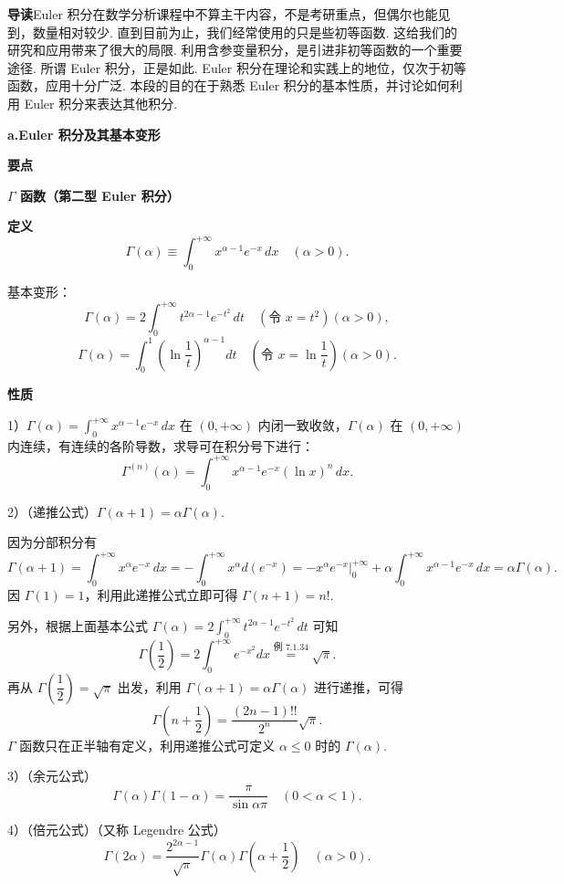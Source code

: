 \documentclass[UTF8,12pt,a4paper,fontset=fandol]{ctexart}
\begin{document}
\noindent\textbf{导读}\quad Euler 积分在数学分析课程中不算主干内容，不是考研重点，但偶尔也能见到，数量相对较少.
直到目前为止，我们经常使用的只是些初等函数. 这给我们的研究和应用带来了很大的局限. 利用含参变量积分，是引进非初等函数的一个重要途径. 所谓 Euler 积分，正是如此. Euler 积分在理论和实践上的地位，仅次于初等函数，应用十分广泛. 本段的目的在于熟悉 Euler 积分的基本性质，并讨论如何利用 Euler 积分来表达其他积分.

\noindent\textbf{a.\quad Euler 积分及其基本变形}

\noindent\textbf{要点}\quad

\noindent\textbf{$\Gamma$ 函数（第二型 Euler 积分）}

\noindent\textbf{定义}\quad
\[
\Gamma(\alpha)\equiv\int_0^{+\infty}x^{\alpha-1}e^{-x}\,dx\quad(\alpha>0).
\]

\noindent 基本变形：
\[
\Gamma(\alpha)=2\int_0^{+\infty}t^{2\alpha-1}e^{-t^2}\,dt
\quad(\text{令 }x=t^2)(\alpha>0),
\]
\[
\Gamma(\alpha)=\int_0^1\left(\ln\frac1t\right)^{\alpha-1}dt
\quad\left(\text{令 }x=\ln\frac1t\right)(\alpha>0).
\]

\noindent\textbf{性质}\quad

1）$\Gamma(\alpha)=\displaystyle\int_0^{+\infty}x^{\alpha-1}e^{-x}\,dx$ 在 $(0,+\infty)$ 内闭一致收敛，$\Gamma(\alpha)$ 在 $(0,+\infty)$ 内连续，有连续的各阶导数，求导可在积分号下进行：
\[
\Gamma^{(n)}(\alpha)=\int_0^{+\infty}x^{\alpha-1}e^{-x}(\ln x)^n\,dx.
\]

2）（递推公式）$\Gamma(\alpha+1)=\alpha\Gamma(\alpha)$.

因为分部积分有
\[
\Gamma(\alpha+1)=\int_0^{+\infty}x^\alpha e^{-x}\,dx
=-\int_0^{+\infty}x^\alpha d(e^{-x})
=-\left.x^\alpha e^{-x}\right|_0^{+\infty}
+\alpha\int_0^{+\infty}x^{\alpha-1}e^{-x}\,dx
=\alpha\Gamma(\alpha).
\]
因 $\Gamma(1)=1$，利用此递推公式立即可得 $\Gamma(n+1)=n!$.

另外，根据上面基本公式 $\Gamma(\alpha)=2\displaystyle\int_0^{+\infty}t^{2\alpha-1}e^{-t^2}\,dt$ 可知
\[
\Gamma\left(\frac12\right)=2\int_0^{+\infty}e^{-x^2}dx
\overset{\text{例 }7.1.34}{=}\sqrt\pi.
\]
再从 $\Gamma\left(\dfrac12\right)=\sqrt\pi$ 出发，利用 $\Gamma(\alpha+1)=\alpha\Gamma(\alpha)$ 进行递推，可得
\[
\Gamma\left(n+\frac12\right)=\frac{(2n-1)!!}{2^n}\sqrt\pi.
\]
$\Gamma$ 函数只在正半轴有定义，利用递推公式可定义 $\alpha\le0$ 时的 $\Gamma(\alpha)$.

3）（余元公式）
\[
\Gamma(\alpha)\Gamma(1-\alpha)=\frac{\pi}{\sin\alpha\pi}\quad(0<\alpha<1).
\]

4）（倍元公式）（又称 Legendre 公式）
\[
\Gamma(2\alpha)=\frac{2^{2\alpha-1}}{\sqrt\pi}\Gamma(\alpha)\Gamma\left(\alpha+\frac12\right)\quad(\alpha>0).
\]
\end{document}

